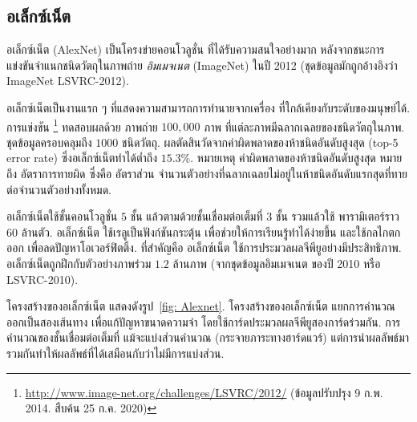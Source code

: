 \subsection{อเล็กซ์เน็ต}
\label{sec: AlexNet}

อเล็กซ์เน็ต (AlexNet\cite{Alexnet2012}) เป็นโครงข่ายคอนโวลูชั่น
ที่ได้รับความสนใจอย่างมาก
หลังจากชนะการแข่งขันจำแนกชนิดวัตถุในภาพถ่าย \textit{อิมเมจเนต} (ImageNet)
ในปี 2012 (ชุดข้อมูลมักถูกอ้างอิงว่า ImageNet LSVRC-2012).

อเล็กซ์เน็ตเป็นงานแรก ๆ ที่แสดงความสามารถการทำนายจากเครื่อง ที่ใกล้เคียงกับระดับของมนุษย์ได้.
การแข่งขัน\cite{ILSVRC15}%
\footnote{%
\url{http://www.image-net.org/challenges/LSVRC/2012/}
(ข้อมูลปรับปรุง 9 ก.พ. 2014. สืบค้น 25 ก.ค. 2020)
}
ทดสอบผลด้วย
ภาพถ่าย $100,000$ ภาพ
ที่แต่ละภาพมีฉลากเฉลยของชนิดวัตถุในภาพ.
ชุดข้อมูลครอบคลุมถึง $1000$ ชนิดวัตถุ.
ผลตัดสินวัดจากค่าผิดพลาดของห้าชนิดอันดับสูงสุด (top-5 error rate)
ซึ่งอเล็กซ์เน็ตทำได้ต่ำถึง $15.3\%$.
%
หมายเหตุ
ค่าผิดพลาดของห้าชนิดอันดับสูงสุด
หมายถึง
อัตราการทายผิด 
ซึ่งคือ อัตราส่วน
จำนวนตัวอย่างที่ฉลากเฉลยไม่อยู่ในห้าชนิดอันดับแรกสุดที่ทาย
ต่อจำนวนตัวอย่างทั้งหมด.

อเล็กซ์เน็ตใช้ชั้นคอนโวลูชั่น $5$ ชั้น
แล้วตามด้วยชั้นเชื่อมต่อเต็มที่ $3$ ชั้น
รวมแล้วใช้ พารามิเตอร์ราว $60$ ล้านตัว.
อเล็กซ์เน็ต
ใช้เรลูเป็นฟังก์ชันกระตุ้น
เพื่อช่วยให้การเรียนรู้ทำได้ง่ายขึ้น
และใช้กลไกตกออก เพื่อลดปัญหาโอเวอร์ฟิตติ้ง.
ที่สำคัญคือ
อเล็กซ์เน็ต ใช้การประมวลผลจีพียูอย่างมีประสิทธิภาพ.
อเล็กซ์เน็ตถูกฝึกกับตัวอย่างภาพร่วม $1.2$ ล้านภาพ (จากชุดข้อมูลอิมเมจเนต ของปี 2010 หรือ LSVRC-2010).

โครงสร้างของอเล็กซ์เน็ต
แสดงดังรูป~\ref{fig: Alexnet}.
โครงสร้างของอเล็กซ์เน็ต 
แยกการคำนวณออกเป็นสองเส้นทาง
เพื่อแก้ปัญหาขนาดความจำ
โดยใช้การ์ดประมวลผลจีพียูสองการ์ดร่วมกัน.
การคำนวณของชั้นเชื่อมต่อเต็มที่
แม้จะแบ่งส่วนคำนวณ (กระจายภาระทางฮาร์ดแวร์)
แต่การนำผลลัพธ์มารวมกันทำให้ผลลัพธ์ที่ได้เสมือนกับว่าไม่มีการแบ่งส่วน.





